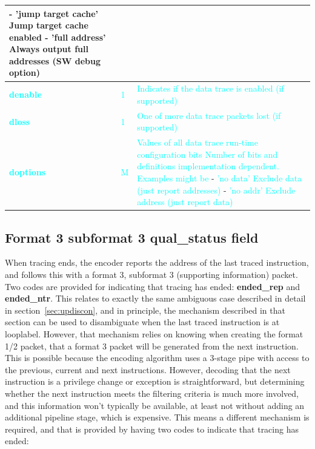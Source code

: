 \begin{table}[htp]
\begin{tabulary}{\textwidth}{|l|p{35mm}|p{90mm}|}
       - 'jump target cache' Jump target cache enabled\newline
       - 'full address' Always output full addresses (SW debug option)\\
       \hline
     \textbf{\textcolor{cyan}{denable}} & \textcolor{cyan}{1} & \textcolor{cyan}{Indicates if the data trace is enabled (if supported)}\\
       \hline
     \textbf{\textcolor{cyan}{dloss}} & \textcolor{cyan}{1} & \textcolor{cyan}{One of more data trace packets lost (if supported)}\\
       \hline
     \textbf{\textcolor{cyan}{doptions}} & \textcolor{cyan}{M} & \textcolor{cyan}{Values of all data trace run-time configuration bits}\newline
       \textcolor{cyan}{Number of bits and definitions implementation dependent.  Examples might be}\newline
       - \textcolor{cyan}{'no data' Exclude data (just report addresses)}\newline
       - \textcolor{cyan}{'no addr' Exclude address (just report data)}\\
       \hline
  \end{tabulary}
\end{table}

\subsection{Format 3 subformat 3 \textbf{qual\_status} field} \label{sec:qual-status}

When tracing ends, the encoder reports the address of the last traced instruction, and follows this with a format 3, 
subformat 3 (supporting information) packet.  Two codes are provided for indicating that tracing has ended: 
\textbf{ended\_rep} and \textbf{ended\_ntr}.  This relates to exactly the same ambiguous case described in detail in 
section~\ref{sec:updiscon}, and in principle, the mechanism described in that section can be used to disambiguate when the last traced
instruction is at looplabel.  However, that mechanism relies on knowing when creating the format 1/2 packet, that 
a format 3 packet will be generated from the next instruction.  This is possible because the encoding algorithm uses 
a 3-stage pipe with access to the previous, current and next instructions.  However, decoding that the next instruction
is a privilege change or exception is straightforward, but determining whether the next instruction meets the filtering
criteria is much more involved, and this information won't typically be available, at least not without adding an
additional pipeline stage, which is expensive.  This means a different mechanism is required, and that is provided
by having two codes to indicate that tracing has ended:

